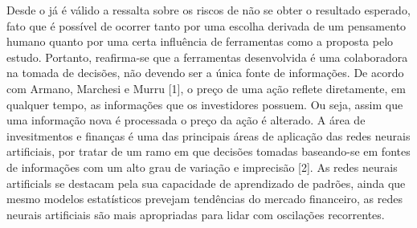 \documentclass[brazil,twocolumn]{svjour3}
\begin{document}
Desde o já é válido a ressalta sobre os riscos de não se obter o resultado esperado, fato que é possível de ocorrer tanto por uma escolha derivada de um pensamento humano quanto por uma certa influência de ferramentas como a proposta pelo estudo. Portanto, reafirma-se que a ferramentas desenvolvida é uma colaboradora na tomada de decisões, não devendo ser a única fonte de informações.
De acordo com Armano, Marchesi e Murru [1], o preço de uma ação reflete diretamente, em qualquer tempo, as informações que os investidores possuem. Ou seja, assim que uma informação nova é processada o preço da ação é alterado.
A área de invesitmentos e finanças é uma das principais áreas de aplicação das redes neurais artificiais, por tratar de um ramo em que decisões tomadas baseando-se em fontes de informações com um alto grau de variação e imprecisão [2]. As redes neurais artificials se destacam pela sua capacidade de aprendizado de padrões, ainda que mesmo modelos estatísticos prevejam tendências do mercado financeiro, as redes neurais artificiais são mais apropriadas para lidar com oscilações recorrentes.
\end{document}
